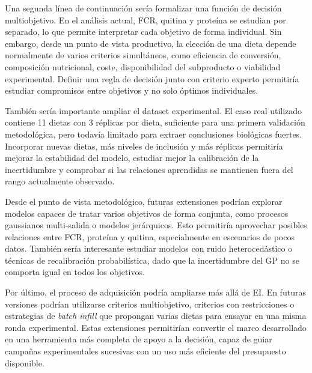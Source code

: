 Una segunda línea de continuación sería formalizar una función de decisión multiobjetivo. En el análisis actual, FCR, quitina y proteína se estudian por separado, lo que permite interpretar cada objetivo de forma individual. Sin embargo, desde un punto de vista productivo, la elección de una dieta depende normalmente de varios criterios simultáneos, como eficiencia de conversión, composición nutricional, coste, disponibilidad del subproducto o viabilidad experimental. Definir una regla de decisión junto con criterio experto permitiría estudiar compromisos entre objetivos y no solo óptimos individuales.

También sería importante ampliar el dataset experimental. El caso real utilizado contiene 11 dietas con 3 réplicas por dieta, suficiente para una primera validación metodológica, pero todavía limitado para extraer conclusiones biológicas fuertes. Incorporar nuevas dietas, más niveles de inclusión y más réplicas permitiría mejorar la estabilidad del modelo, estudiar mejor la calibración de la incertidumbre y comprobar si las relaciones aprendidas se mantienen fuera del rango actualmente observado.

Desde el punto de vista metodológico, futuras extensiones podrían explorar modelos capaces de tratar varios objetivos de forma conjunta, como procesos gaussianos multi-salida o modelos jerárquicos. Esto permitiría aprovechar posibles relaciones entre FCR, proteína y quitina, especialmente en escenarios de pocos datos. También sería interesante estudiar modelos con ruido heterocedástico o técnicas de recalibración probabilística, dado que la incertidumbre del GP no se comporta igual en todos los objetivos.

Por último, el proceso de adquisición podría ampliarse más allá de EI. En futuras versiones podrían utilizarse criterios multiobjetivo, criterios con restricciones o estrategias de \emph{batch infill} que propongan varias dietas para ensayar en una misma ronda experimental. Estas extensiones permitirían convertir el marco desarrollado en una herramienta más completa de apoyo a la decisión, capaz de guiar campañas experimentales sucesivas con un uso más eficiente del presupuesto disponible.
